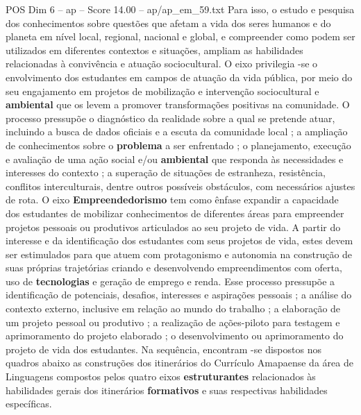 \begin{textsample}{POS Dim 6 – ap – Score 14.00 – ap/ap\_em\_59.txt}
Para isso, o estudo e pesquisa dos conhecimentos sobre questões que afetam a vida dos seres humanos e do planeta em nível local, regional, nacional e global, e compreender como podem ser utilizados em diferentes contextos e situações, ampliam as habilidades relacionadas à convivência e atuação sociocultural.
O eixo privilegia -se o envolvimento dos estudantes em campos de atuação da vida pública, por meio do seu engajamento em projetos de mobilização e intervenção sociocultural e \textbf{ambiental} que os levem a promover transformações positivas na comunidade.
O processo pressupõe o diagnóstico da realidade sobre a qual se pretende atuar, incluindo a busca de dados oficiais e a escuta da comunidade local ; a ampliação de conhecimentos sobre o \textbf{problema} a ser enfrentado ; o planejamento, execução e avaliação de uma ação social e/ou \textbf{ambiental} que responda às necessidades e interesses do contexto ; a superação de situações de estranheza, resistência, conflitos interculturais, dentre outros possíveis obstáculos, com necessários ajustes de rota.
O eixo \textbf{Empreendedorismo} tem como ênfase expandir a capacidade dos estudantes de mobilizar conhecimentos de diferentes áreas para empreender projetos pessoais ou produtivos articulados ao seu projeto de vida.
A partir do interesse e da identificação dos estudantes com seus projetos de vida, estes devem ser estimulados para que atuem com protagonismo e autonomia na construção de suas próprias trajetórias criando e desenvolvendo empreendimentos com oferta, uso de \textbf{tecnologias} e geração de emprego e renda.
Esse processo pressupõe a identificação de potenciais, desafios, interesses e aspirações pessoais ; a análise do contexto externo, inclusive em relação ao mundo do trabalho ; a elaboração de um projeto pessoal ou produtivo ; a realização de ações-piloto para testagem e aprimoramento do projeto elaborado ; o desenvolvimento ou aprimoramento do projeto de vida dos estudantes.
Na sequência, encontram -se dispostos nos quadros abaixo as construções dos itinerários do Currículo Amapaense da área de Linguagens compostos pelos quatro eixos \textbf{estruturantes} relacionados às habilidades gerais dos itinerários \textbf{formativos} e suas respectivas habilidades específicas.

\end{textsample}
